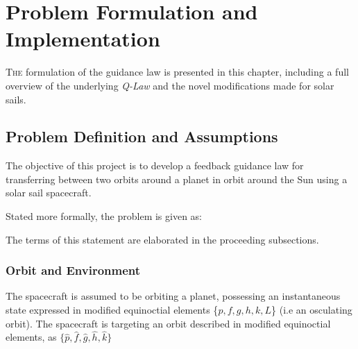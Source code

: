 \chapter{Problem Formulation and Implementation}

\lettrine{T}{he} formulation of the guidance law is presented in this chapter, including a full overview of the underlying \textit{Q-Law} and the novel modifications made for solar sails.

\section{Problem Definition and Assumptions}
The objective of this project is to develop a feedback guidance law for transferring between two orbits around a planet in orbit around the Sun using a solar sail spacecraft.

Stated more formally, the problem is given as:


The terms of this statement are elaborated in the proceeding subsections.

\subsection{Orbit and Environment}
\label{sec:orbit_environment}
The spacecraft is assumed to be orbiting a planet, possessing an instantaneous state expressed in modified equinoctial elements \{\(p, f, g, h, k, L\)\} (i.e an osculating orbit). The spacecraft is targeting an orbit described in modified equinoctial elements, as \(\{\hat{p}, \hat{f}, \hat{g}, \hat{h}, \hat{k}\}\)

